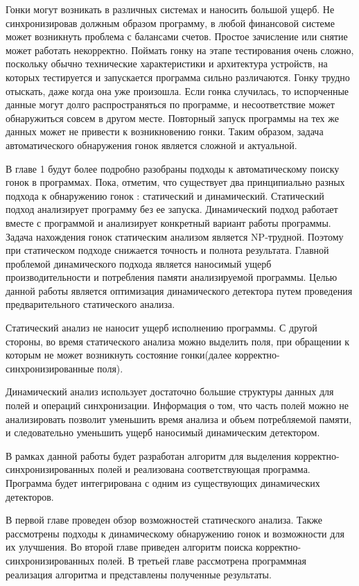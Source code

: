 Гонки могут возникать в различных системах и наносить большой ущерб. Не синхронизировав должным образом программу, в любой финансовой системе может возникнуть проблема с балансами счетов. Простое зачисление или снятие может работать некорректно. Поймать гонку на этапе тестирования очень сложно, поскольку обычно технические характеристики и архитектура устройств, на которых тестируется и запускается программа сильно различаются. Гонку трудно отыскать, даже когда она уже произошла. Если гонка случилась, то испорченные данные могут долго распространяться по программе, и несоответствие может обнаружиться совсем в другом месте. Повторный запуск программы на тех же данных может не привести к возникновению гонки. Таким образом, задача автоматического обнаружения гонок является
сложной и актуальной.

В главе 1 будут более подробно разобраны подходы к автоматическому поиску гонок в программах. Пока, отметим, что существует два принципиально разных подхода к обнаружению гонок : статический и динамический. Статический подход  анализирует программу без ее запуска. Динамический подход работает вместе с программой и анализирует конкретный вариант работы программы. Задача нахождения гонок статическим анализом является NP-трудной. Поэтому при статическом подходе снижается точность и полнота результата. Главной проблемой динамического подхода является наносимый ущерб производительности и потребления памяти анализируемой программы. Целью данной работы является оптимизация динамического детектора путем проведения предварительного статического анализа. 

Статический анализ не наносит ущерб исполнению программы. С другой стороны, во время статического анализа можно выделить поля, при обращении к которым не может возникнуть состояние гонки(далее корректно-синхронизированные поля).

Динамический анализ использует достаточно большие структуры данных для полей и операций синхронизации. Информация о том, что часть полей можно не анализировать позволит уменьшить время анализа и объем потребляемой памяти, и следовательно уменьшить ущерб наносимый динамическим детектором.

В рамках данной работы будет разработан алгоритм для выделения корректно-синхронизированных полей и реализована соответствующая программа. Программа будет интегрирована с одним из существующих динамических детекторов.

В первой главе проведен обзор возможностей статического анализа. Также рассмотрены подходы к динамическому обнаружению гонок и возможности для их улучшения. Во второй главе приведен алгоритм поиска корректно-синхронизированных полей. В третьей главе рассмотрена программная реализация алгоритма и представлены полученные результаты.
\FloatBarrier
